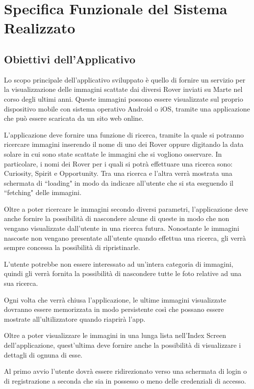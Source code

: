 \chapter{Specifica Funzionale del Sistema Realizzato}
\section{Obiettivi dell'Applicativo}
Lo scopo principale dell'applicativo sviluppato \`e quello di fornire un servizio per la visualizzazione delle immagini scattate dai diversi Rover inviati su Marte nel corso degli ultimi anni.
Queste immagini possono essere visualizzate sul proprio dispositivo mobile con sistema operativo Android o iOS, tramite una applicazione che pu\`o essere scaricata da un sito web online.

L'applicazione deve fornire una funzione di ricerca, tramite la quale si potranno ricercare immagini inserendo il nome di uno dei Rover oppure digitando la data solare in cui sono state scattate le immagini che si vogliono osservare. In particolare, i nomi dei Rover per i quali si potr\`a effettuare una ricerca sono: Curiosity, Spirit e Opportunity.
Tra una ricerca e l'altra verr\`a mostrata una schermata di ``loading" in modo da indicare all'utente che si sta eseguendo il ``fetching" delle immagini.

Oltre a poter ricercare le immagini secondo diversi parametri, l'applicazione deve anche fornire la possibilit\`a di nascondere alcune di queste in modo che non vengano visualizzate dall'utente in una ricerca futura.
Nonostante le immagini nascoste non vengano presentate all'utente quando effettua una ricerca, gli verr\`a sempre concessa la possibilit\`a di ripristinarle.

L'utente potrebbe non essere interessato ad un'intera categoria di immagini, quindi gli verr\`a fornita la possibilit\`a di nascondere tutte le foto relative ad una sua ricerca.

Ogni volta che verr\`a chiusa l'applicazione, le ultime immagini visualizzate dovranno essere memorizzata in modo persistente cos\`i che possano essere mostrate all'ultilizzatore quando riaprir\`a l'app.

Oltre a poter visualizzare le immagini in una lunga lista nell'Index Screen dell'applicazione, quest'ultima deve fornire anche la possibilit\`a di visualizzare i dettagli di ognuna di esse.

Al primo avvio l'utente dovr\`a essere ridirezionato verso una schermata di login o di registrazione a seconda che sia in possesso o meno delle credenziali di accesso.

